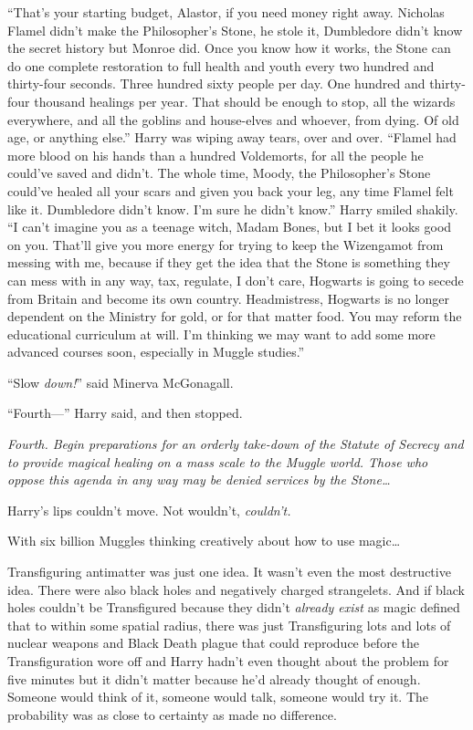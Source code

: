 “That’s your starting budget, Alastor, if you need money right away. Nicholas Flamel didn’t make the Philosopher’s Stone, he stole it, Dumbledore didn’t know the secret history but Monroe did. Once you know how it works, the Stone can do one complete restoration to full health and youth every two hundred and thirty-four seconds. Three hundred sixty people per day. One hundred and thirty-four thousand healings per year. That should be enough to stop, all the wizards everywhere, and all the goblins and house-elves and whoever, from dying. Of old age, or anything else.” Harry was wiping away tears, over and over. “Flamel had more blood on his hands than a hundred Voldemorts, for all the people he could’ve saved and didn’t. The whole time, Moody, the Philosopher’s Stone could’ve healed all your scars and given you back your leg, any time Flamel felt like it. Dumbledore didn’t know. I’m sure he didn’t know.” Harry smiled shakily. “I can’t imagine you as a teenage witch, Madam Bones, but I bet it looks good on you. That’ll give you more energy for trying to keep the Wizengamot from messing with me, because if they get the idea that the Stone is something they can mess with in any way, tax, regulate, I don’t care, Hogwarts is going to secede from Britain and become its own country. Headmistress, Hogwarts is no longer dependent on the Ministry for gold, or for that matter food. You may reform the educational curriculum at will. I’m thinking we may want to add some more advanced courses soon, especially in Muggle studies.”

“Slow \emph{down!}” said Minerva McGonagall.

“Fourth—” Harry said, and then stopped.

\emph{Fourth. Begin preparations for an orderly take-down of the Statute of Secrecy and to provide magical healing on a mass scale to the Muggle world. Those who oppose this agenda in any way may be denied services by the Stone…}

Harry’s lips couldn’t move. Not wouldn’t, \emph{couldn’t.}

With six billion Muggles thinking creatively about how to use magic…

Transfiguring antimatter was just one idea. It wasn’t even the most destructive idea. There were also black holes and negatively charged strangelets. And if black holes couldn’t be Transfigured because they didn’t \emph{already exist} as magic defined that to within some spatial radius, there was just Transfiguring lots and lots of nuclear weapons and Black Death plague that could reproduce before the Transfiguration wore off and Harry hadn’t even thought about the problem for five minutes but it didn’t matter because he’d already thought of enough. Someone would think of it, someone would talk, someone would try it. The probability was as close to certainty as made no difference.

